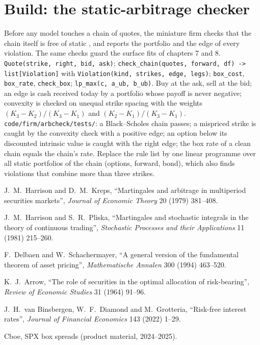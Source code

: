 \section{Build: the static-arbitrage checker}\label{bld:dv:no-arbitrage-and-the-fundamental-theorems:arbcheck}

\begin{build}
 Before any model touches a chain of quotes, the miniature firm
checks that the chain itself is free of static , and reports the
portfolio and the edge of every violation. The same checks guard the surface
fits of chapters 7 and 8.
 \texttt{Quote(strike, right, bid, ask)};
\texttt{check\_chain(quotes, forward, df) -> list[Violation]} with
\texttt{Violation(kind, strikes, edge, legs)}; \texttt{box\_cost},
\texttt{box\_rate}, \texttt{check\_box}; \texttt{lp\_max(c, a\_ub, b\_ub)}.
 Buy at the ask, sell at the bid; an edge is cash received today by a
portfolio whose payoff is never negative; convexity is checked on unequal
strike spacing with the weights $(K_3-K_2)/(K_3-K_1)$ and $(K_2-K_1)/(K_3-K_1)$.
 \texttt{code/firm/arbcheck/tests/}: a Black--Scholes
chain passes; a mispriced strike is caught by the convexity check with a
positive edge; an option below its discounted intrinsic value is caught with the
right edge; the box rate of a clean chain equals the chain's rate.
 Replace the rule list by one linear programme over all
static portfolios of the chain (options, forward, bond), which also finds
violations that combine more than three strikes.
\end{build}

\begin{omsources}
\item J.~M.~Harrison and D.~M.~Kreps, ``Martingales and arbitrage in multiperiod
securities markets'', \emph{Journal of Economic Theory} 20 (1979) 381--408.
\item J.~M.~Harrison and S.~R.~Pliska, ``Martingales and stochastic integrals in
the theory of continuous trading'', \emph{Stochastic Processes and their
Applications} 11 (1981) 215--260.
\item F.~Delbaen and W.~Schachermayer, ``A general version of the fundamental
theorem of asset pricing'', \emph{Mathematische Annalen} 300 (1994) 463--520.
\item K.~J.~Arrow, ``The role of securities in the optimal allocation of
risk-bearing'', \emph{Review of Economic Studies} 31 (1964) 91--96.
\item J.~H.~van Binsbergen, W.~F.~Diamond and M.~Grotteria, ``Risk-free
interest rates'', \emph{Journal of Financial Economics} 143 (2022) 1--29.
\item Cboe, SPX box spreads (product material, 2024--2025).
\end{omsources}

